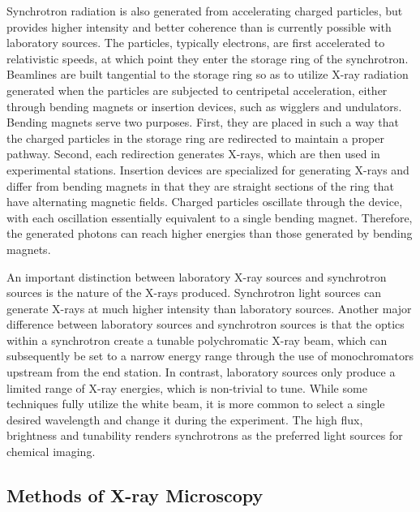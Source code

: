 \documentclass[journal=cmatex,manuscript=perspective]{achemso}
\begin{document}
Synchrotron radiation is also generated from accelerating charged
particles, but provides higher intensity and better coherence than is
currently possible with laboratory sources. The particles, typically
electrons, are first accelerated to relativistic speeds, at which
point they enter the storage ring of the synchrotron. Beamlines are
built tangential to the storage ring so as to utilize X-ray radiation
generated when the particles are subjected to centripetal
acceleration, either through bending magnets or insertion devices,
such as wigglers and undulators. Bending magnets serve two
purposes. First, they are placed in such a way that the charged
particles in the storage ring are redirected to maintain a proper
pathway. Second, each redirection generates X-rays, which are then
used in experimental stations. Insertion devices are specialized for
generating X-rays and differ from bending magnets in that they are
straight sections of the ring that have alternating magnetic
fields. Charged particles oscillate through the device, with each
oscillation essentially equivalent to a single bending
magnet. Therefore, the generated photons can reach higher energies
than those generated by bending magnets\cite{synchrotronradiation}.

An important distinction between laboratory X-ray sources and
synchrotron sources is the nature of the X-rays produced. Synchrotron
light sources can generate X-rays at much higher intensity than
laboratory sources. Another major difference between laboratory
sources and synchrotron sources is that the optics within a
synchrotron create a tunable polychromatic X-ray beam, which can
subsequently be set to a narrow energy range through the use of
monochromators upstream from the end station. In contrast, laboratory
sources only produce a limited range of X-ray energies, which is
non-trivial to tune. While some techniques fully utilize the white
beam\cite{ice2009}, it is more common to select a single desired
wavelength and change it during the experiment. The high flux,
brightness and tunability renders synchrotrons as the preferred light
sources for chemical imaging.

\subsection{Methods of X-ray Microscopy}
\end{document}
